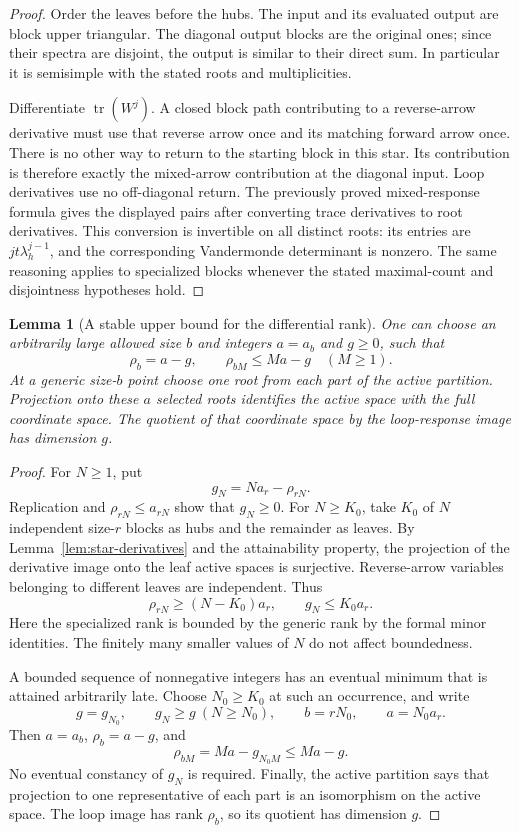 \documentclass[11pt]{article}
\newtheorem{lemma}[theorem]{Lemma}
\theoremstyle{definition}
\theoremstyle{remark}
\numberwithin{equation}{section}
\begin{document}
\begin{proof}
Order the leaves before the hubs. The input and its evaluated output
are block upper triangular. The diagonal output blocks are the
original ones; since their spectra are disjoint, the output is similar
to their direct sum. In particular it is semisimple with the stated
roots and multiplicities.

Differentiate \(\operatorname{tr}(W^j)\). A closed block path
contributing to a reverse-arrow derivative must use that reverse
arrow once and its matching forward arrow once. There is no other
way to return to the starting block in this star. Its contribution
is therefore exactly the mixed-arrow contribution at the diagonal
input. Loop derivatives use no off-diagonal return. The previously
proved mixed-response formula gives the displayed pairs after
converting trace derivatives to root derivatives. This conversion is
invertible on all distinct roots: its entries are
\(jt\lambda_h^{j-1}\), and the corresponding Vandermonde determinant
is nonzero. The same reasoning applies to specialized blocks whenever
the stated maximal-count and disjointness hypotheses hold.
\end{proof}

\begin{lemma}[A stable upper bound for the differential rank]
\label{lem:tail-defect}
One can choose an arbitrarily large allowed size \(b\) and integers
\(a=a_b\) and \(g\geq0\), such that
\[
 \rho_b=a-g,
 \qquad
 \rho_{bM}\leq Ma-g \quad(M\geq1).
\]
At a generic size-\(b\) point choose one root from each part of the
active partition. Projection onto these \(a\) selected roots
identifies the active space with the full coordinate space. The
quotient of that coordinate space by the loop-response image has
dimension \(g\).
\end{lemma}

\begin{proof}
For \(N\geq1\), put
\[
 g_N=Na_r-\rho_{rN}.
\]
Replication and \(\rho_{rN}\leq a_{rN}\) show that \(g_N\geq0\).
For \(N\geq K_0\), take \(K_0\) of \(N\) independent size-\(r\)
blocks as hubs and the remainder as leaves. By
Lemma~\ref{lem:star-derivatives} and the attainability property, the
projection of the derivative image onto the leaf active spaces is
surjective. Reverse-arrow variables belonging to different leaves
are independent. Thus
\[
 \rho_{rN}\geq(N-K_0)a_r,
 \qquad g_N\leq K_0a_r.
\]
Here the specialized rank is bounded by the generic rank by the
formal minor identities. The finitely many smaller values of \(N\)
do not affect boundedness.

A bounded sequence of nonnegative integers has an eventual minimum
that is attained arbitrarily late. Choose \(N_0\geq K_0\) at such
an occurrence, and write
\[
 g=g_{N_0},\qquad
 g_N\geq g\ (N\geq N_0),\qquad
 b=rN_0,\qquad a=N_0a_r.
\]
Then \(a=a_b\), \(\rho_b=a-g\), and
\[
 \rho_{bM}=Ma-g_{N_0M}\leq Ma-g.
\]
No eventual constancy of \(g_N\) is required. Finally, the active
partition says that projection to one representative of each part
is an isomorphism on the active space. The loop image has rank
\(\rho_b\), so its quotient has dimension \(g\).
\end{proof}
\end{document}
